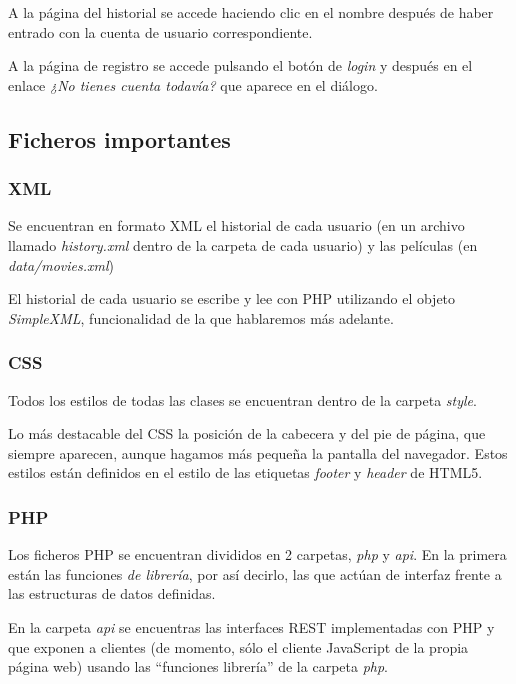 \documentclass{apuntes}
\begin{document}
A la página del historial se accede haciendo clic en el nombre después de haber entrado con la cuenta de usuario correspondiente. 

A la página de registro se accede pulsando el botón de \textit{login} y después en el enlace \textit{¿No tienes cuenta todavía?} que aparece en el diálogo. 


\subsection{Ficheros importantes}

\subsubsection{XML}

Se encuentran en formato XML el historial de cada usuario (en un archivo llamado \textit{history.xml} dentro de la carpeta de cada usuario) y las películas (en \textit{data/movies.xml})


El historial de cada usuario se escribe y lee con PHP utilizando el objeto \textit{SimpleXML}, funcionalidad de la que hablaremos más adelante.



\subsubsection{CSS}

Todos los estilos de todas las clases se encuentran dentro de la carpeta \textit{style}.

Lo más destacable del CSS la posición de la cabecera y del pie de página, que siempre aparecen, aunque hagamos más pequeña la pantalla del navegador. Estos estilos están definidos en el estilo de las etiquetas \textit{footer} y \textit{header} de HTML5.

\subsubsection{PHP}

Los ficheros PHP se encuentran divididos en 2 carpetas, \textit{php} y \textit{api}. En la primera están las funciones \textit{de librería}, por así decirlo, las que actúan de interfaz frente a las estructuras de datos definidas.

En la carpeta \textit{api} se encuentras las interfaces REST implementadas con PHP y que exponen a clientes (de momento, sólo el cliente JavaScript de la propia página web) usando las ``funciones librería'' de la carpeta \textit{php}.
\end{document}
